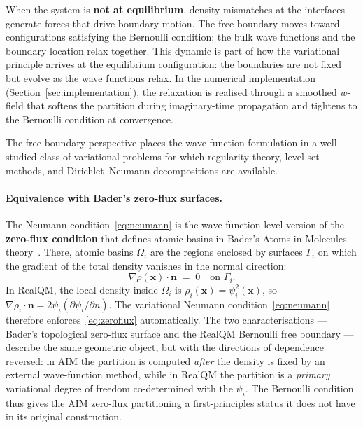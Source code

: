 \documentclass[11pt]{article}
\begin{document}
When the system is \textbf{not at equilibrium}, density mismatches at the interfaces generate forces that drive boundary motion. The free boundary moves toward configurations satisfying the Bernoulli condition; the bulk wave functions and the boundary location relax together. This dynamic is part of how the variational principle arrives at the equilibrium configuration: the boundaries are not fixed but evolve as the wave functions relax. In the numerical implementation (Section~\ref{sec:implementation}), the relaxation is realised through a smoothed $w$-field that softens the partition during imaginary-time propagation and tightens to the Bernoulli condition at convergence.

The free-boundary perspective places the wave-function formulation in a well-studied class of variational problems for which regularity theory, level-set methods, and Dirichlet--Neumann decompositions are available.

\paragraph{Equivalence with Bader's zero-flux surfaces.}
The Neumann condition~\eqref{eq:neumann} is the wave-function-level version of the \textbf{zero-flux condition} that defines atomic basins in Bader's Atoms-in-Molecules theory~\cite{Bader90}. There, atomic basins $\Omega_i$ are the regions enclosed by surfaces $\Gamma_i$ on which the gradient of the total density vanishes in the normal direction:
\begin{equation}\label{eq:zeroflux}
\nabla \rho(\mathbf{x}) \cdot \mathbf{n} \;=\; 0 \quad \text{on } \Gamma_i.
\end{equation}
In RealQM, the local density inside $\Omega_i$ is $\rho_i(\mathbf{x}) = \psi_i^2(\mathbf{x})$, so $\nabla \rho_i \cdot \mathbf{n} = 2\psi_i (\partial \psi_i/\partial n)$. The variational Neumann condition~\eqref{eq:neumann} therefore enforces~\eqref{eq:zeroflux} automatically. The two characterisations --- Bader's topological zero-flux surface and the RealQM Bernoulli free boundary --- describe the same geometric object, but with the directions of dependence reversed: in AIM the partition is computed \emph{after} the density is fixed by an external wave-function method, while in RealQM the partition is a \emph{primary} variational degree of freedom co-determined with the $\psi_i$. The Bernoulli condition thus gives the AIM zero-flux partitioning a first-principles status it does not have in its original construction.
\end{document}
